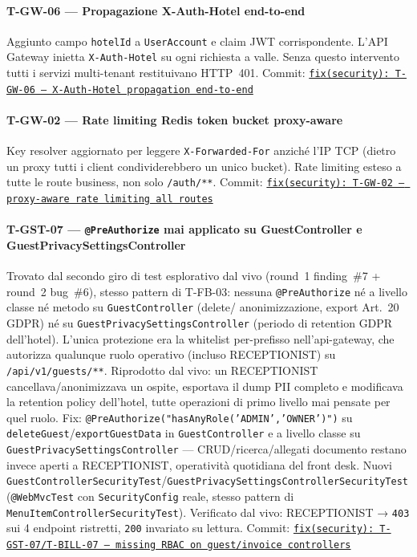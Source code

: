 ﻿\documentclass[a4paper,12pt]{report}
\newcommand{\commitref}[2]{\texttt{\small \href{https://github.com/diegoandruccioli/hotel-pms/commit/#1}{#2}}}
\begin{document}
\paragraph{T-GW-06 --- Propagazione X-Auth-Hotel end-to-end}
Aggiunto campo \texttt{hotelId} a \texttt{UserAccount} e claim JWT corrispondente.
L'API Gateway inietta \texttt{X-Auth-Hotel} su ogni richiesta a valle.
Senza questo intervento tutti i servizi multi-tenant restituivano HTTP~401.
Commit: \commitref{b469e21}{fix(security): T-GW-06 --- X-Auth-Hotel propagation end-to-end}

\paragraph{T-GW-02 --- Rate limiting Redis token bucket proxy-aware}
Key resolver aggiornato per leggere \texttt{X-Forwarded-For} anziché l'IP TCP
(dietro un proxy tutti i client condividerebbero un unico bucket).
Rate limiting esteso a tutte le route business, non solo \texttt{/auth/**}.
Commit: \commitref{3f8a1c2}{fix(security): T-GW-02 --- proxy-aware rate limiting all routes}

\paragraph{T-GST-07 --- \texttt{@PreAuthorize} mai applicato su GuestController e GuestPrivacySettingsController}
Trovato dal secondo giro di test esplorativo dal vivo (round~1 finding~\#7 +
round~2 bug~\#6), stesso pattern di T-FB-03: nessuna \texttt{@PreAuthorize}
né a livello classe né metodo su \texttt{GuestController} (delete/
anonimizzazione, export Art.~20 GDPR) né su
\texttt{GuestPrivacySettingsController} (periodo di retention GDPR
dell'hotel). L'unica protezione era la whitelist per-prefisso
nell'api-gateway, che autorizza qualunque ruolo operativo (incluso
RECEPTIONIST) su \texttt{/api/v1/guests/**}. Riprodotto dal vivo: un
RECEPTIONIST cancellava/anonimizzava un ospite, esportava il dump PII
completo e modificava la retention policy dell'hotel, tutte operazioni
di primo livello mai pensate per quel ruolo.
Fix: \texttt{@PreAuthorize("hasAnyRole('ADMIN','OWNER')")} su
\texttt{deleteGuest}/\texttt{exportGuestData} in \texttt{GuestController}
e a livello classe su \texttt{GuestPrivacySettingsController} ---
CRUD/ricerca/allegati documento restano invece aperti a RECEPTIONIST,
operatività quotidiana del front desk. Nuovi
\texttt{GuestControllerSecurityTest}/\texttt{GuestPrivacySettingsControllerSecurityTest}
(\texttt{@WebMvcTest} con \texttt{SecurityConfig} reale, stesso pattern di
\texttt{MenuItemControllerSecurityTest}). Verificato dal vivo: RECEPTIONIST
→ \texttt{403} sui 4 endpoint ristretti, \texttt{200} invariato su lettura.
Commit: \commitref{a87d329}{fix(security): T-GST-07/T-BILL-07 --- missing RBAC on guest/invoice controllers}
\end{document}
